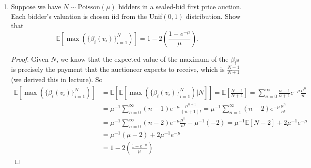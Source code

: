 \documentclass[10pt]{article}
\newcommand{\E}{\mathbb{E}}
\begin{document}
\begin{enumerate}
\begin{proof}
\begin{align*}
\beta(v) &= \int_{0}^v 1 - \left(\frac{F(w)}{F(v)} \right)^{n-1} dw
\\
&= v - \int_0^v \frac{(1-e^{-\lambda w})^{n-1}}{(1-e^{-\lambda v})^{n-1}} dw
\\
&= v - (1-e^{-\lambda v})^{1-n}\int_0^v (1-e^{-\lambda w})^{n-1} dw
\\
&= v - (1-e^{-\lambda v})^{1-n}\int_0^v \sum_{k=1}^{n-1}\binom{n-1}{k}1^k (-1)^{-(n-k-1)}e^{-\lambda w (n-k-1)} dw
\\
&= v - (1-e^{-\lambda v})^{1-n}\sum_{k=1}^{n-1}\binom{n-1}{k} (-1)^{-(n-k-1)} \int_0^v e^{-\lambda w (n-k-1)} dw
\\
&= v - (1-e^{-\lambda v})^{1-n} \left[ \sum_{k=1}^{n-2}\binom{n-1}{k} (-1)^{-(n-k-1)} \frac{e^{-\lambda v (n-k-1)} - e^{-\lambda(0)(n-k-1)}}{-\lambda(n-k-1)} + v \right]
\\
&= v - (1-e^{-\lambda v})^{1-n}\left[\sum_{k=1}^{n-2}\binom{n-1}{k} (-1)^{-(n-k-1)} \frac{1 - e^{-\lambda v (n-k-1)}}{\lambda(n-k-1)} + v \right]
\\
&= v - (1-e^{\lambda v})^{1-n}
\lambda^{-1} \left[ \sum_{k=0}^{n-2} \frac{(-1)^{n-k-1} \binom{n-1}{k} (1 - e^{-\lambda(n-k-1)v})}{n-k-1} + v \right].
\end{align*}
\end{proof}

\item Suppose we have $N \sim \text{Poisson}(\mu)$ bidders in a sealed-bid first price auction.  Each bidder's valuation is chosen iid from the Unif$(0,1)$ distribution.  Show that
$$
\E [ \max (\{\beta_i (v_i)\}_{i=1}^N) ] = 1 - 2 \left( \frac{1-e^{-\mu}}{\mu} \right).
$$
\begin{proof}
Given $N$, we know that the expected value of the maximum of the $\beta_i$s is precisely the payment that the auctioneer expects to receive, which is $\frac{N-1}{N+1}$ (we derived this in lecture).
So
\begin{align*}
\E [ \max (\{\beta_i (v_i)\}_{i=1}^N) ] &=
\E[\E [ \max (\{\beta_i (v_i)\}_{i=1}^N) |N]]
= \E\left[\frac{N-1}{N+1}\right]
= \sum_{n=0}^\infty \frac{n-1}{n+1}e^{-\mu}\frac{\mu^n}{n!}
\\
&= \mu^{-1} \sum_{n=0}^\infty (n-1)e^{-\mu}\frac{\mu^{n+1}}{(n+1)!}
= \mu^{-1} \sum_{n=1}^\infty (n-2)e^{-\mu}\frac{\mu^{n}}{n!}
\\
&= \mu^{-1} \sum_{n=0}^\infty (n-2)e^{-\mu}\frac{\mu^{n}}{n!} - \mu^{-1}(-2)
= \mu^{-1} \E[N-2] + 2\mu^{-1}e^{-\mu}
\\
&= \mu^{-1}(\mu - 2) + 2\mu^{-1}e^{-\mu}
\\
&= 1 - 2 \left( \frac{1-e^{-\mu}}{\mu} \right)
\end{align*}
\end{proof}
\end{enumerate}
\end{document}
